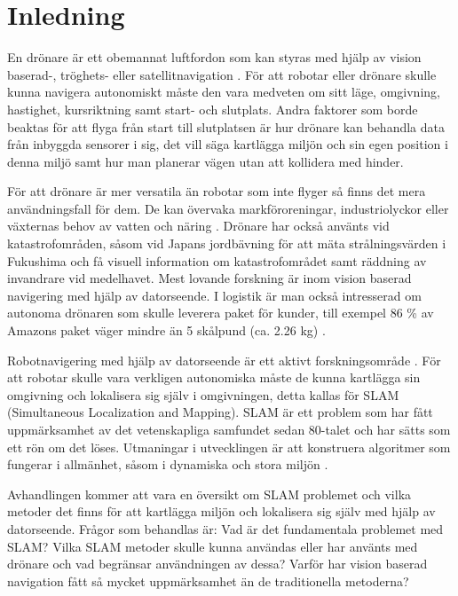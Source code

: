 \chapter{Inledning}

En drönare är ett obemannat luftfordon som kan styras med hjälp av vision baserad-, tröghets- eller satellitnavigation \citep{geospatial}. För att robotar eller drönare skulle kunna navigera autonomiskt måste den vara medveten om sitt läge, omgivning, hastighet, kursriktning samt start- och slutplats. Andra faktorer som borde beaktas för att flyga från start till slutplatsen är hur drönare kan behandla data från inbyggda sensorer i sig, det vill säga kartlägga miljön och sin egen position i denna miljö samt hur man planerar vägen utan att kollidera med hinder.

För att drönare är mer versatila än robotar som inte flyger så finns det mera användningsfall för dem. De kan övervaka markföroreningar, industriolyckor eller växternas behov av vatten och näring \citep{crowdsurveillance}. Drönare har också använts vid katastrofområden, såsom vid Japans jordbävning för att mäta strålningsvärden i Fukushima och få visuell information om katastrofområdet samt räddning av invandrare vid medelhavet. Mest lovande forskning är inom vision baserad navigering med hjälp av datorseende. I logistik är man också intresserad om autonoma drönaren som skulle leverera paket för kunder, till exempel 86 \% av Amazons paket väger mindre än 5 skålpund (ca. 2.26 kg) \citep{cbsnews}.

Robotnavigering med hjälp av datorseende är ett aktivt forskningsområde \citep{982903}. För att robotar skulle vara verkligen autonomiska måste de kunna kartlägga sin omgivning och lokalisera sig själv i omgivningen, detta kallas för SLAM (Simultaneous Localization and Mapping). SLAM är ett problem som har fått uppmärksamhet av det vetenskapliga samfundet sedan 80-talet och har sätts som ett rön om det löses. Utmaningar i utvecklingen är att konstruera algoritmer som fungerar i allmänhet, såsom i dynamiska och stora miljön \citep{realslamproblem}.

Avhandlingen kommer att vara en översikt om SLAM problemet och vilka metoder det finns för att kartlägga miljön och lokalisera sig själv med hjälp av datorseende. Frågor som behandlas är: Vad är det fundamentala problemet med SLAM? Vilka SLAM metoder skulle kunna användas eller har använts med drönare och vad begränsar användningen av dessa? Varför har vision baserad navigation fått så mycket uppmärksamhet än de traditionella metoderna?

